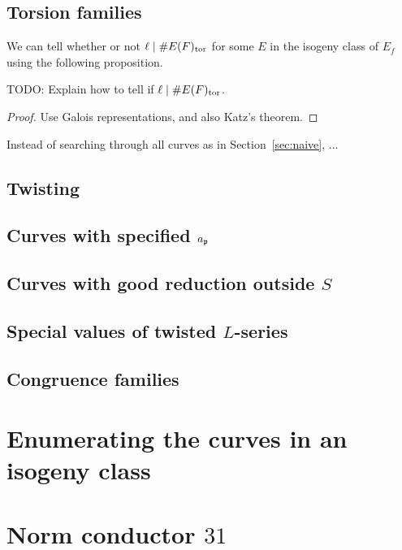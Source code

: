 \documentclass{amsart}
\begin{document}
\subsection{Torsion families}\label{sec:torsion}

We can tell whether or not $\ell\mid \#E(F)_{\operatorname{tor}}$ for some
$E$ in the isogeny class of $E_f$ using the following proposition.

\begin{proposition}
 TODO: Explain how to tell if $\ell\mid \#E(F)_{\operatorname{tor}}$.
\end{proposition}
\begin{proof}
  Use Galois representations, and also Katz's theorem.
\end{proof}

Instead of searching through all curves as in Section~\ref{sec:naive},
...


\subsection{Twisting}

\subsection{Curves with specified $a_{\mathfrak{p}}$}

\subsection{Curves with good reduction outside $S$}

\subsection{Special values of twisted $L$-series}

\subsection{Congruence families}

\section{Enumerating the curves in an isogeny class}

\section{Norm conductor $31$}\label{sec:31}
\end{document}
